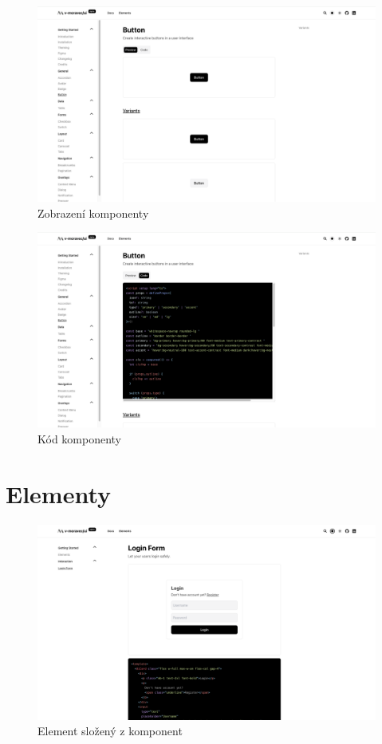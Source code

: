 \begin{figure}[H]
  \includegraphics[width=\textwidth]{images/component-preview}
  \caption{Zobrazení komponenty} \label{picture:documentation:component-preview}
\end{figure}

\begin{figure}[H]
  \includegraphics[width=\textwidth]{images/component-code}
  \caption{Kód komponenty} \label{picture:documentation:component-code}
\end{figure}

\section{Elementy}

\begin{figure}[H]
  \includegraphics[width=\textwidth]{images/element}
  \caption{Element složený z komponent} \label{picture:documentation:element}
\end{figure}
